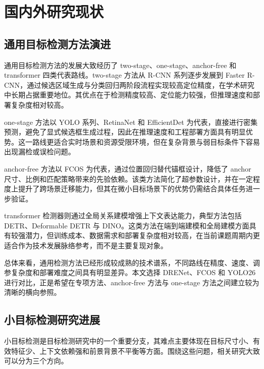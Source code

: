 
\chapter{国内外研究现状}
\label{ch:related_work}

\section{通用目标检测方法演进}

通用目标检测方法的发展大致经历了 two-stage、one-stage、anchor-free 和 transformer 四类代表路线。two-stage 方法从 R-CNN 系列逐步发展到 Faster R-CNN，通过候选区域生成与分类回归两阶段流程实现较高定位精度，在学术研究中长期占据重要地位\cite{girshick2014_rcnn,ren2015_fasterrcnn}。其优点在于检测精度较高、定位能力较强，但推理速度和部署复杂度相对较高。

one-stage 方法以 YOLO 系列、RetinaNet 和 EfficientDet 为代表，直接进行密集预测，避免了显式候选框生成过程，因此在推理速度和工程部署方面具有明显优势\cite{redmon2016_yolo,redmon2018_yolov3,lin2017_focalloss,tan2020_efficientdet}。这一路线更适合实时场景和资源受限环境，但在复杂背景与弱目标条件下容易出现漏检或误检问题。

anchor-free 方法以 FCOS 为代表，通过位置回归替代锚框设计，降低了 anchor 尺寸、比例和匹配策略带来的先验依赖\cite{tian2019_fcos}。该类方法简化了超参数设计，并在一定程度上提升了跨场景迁移能力，但其在微小目标场景下的优势仍需结合具体任务进一步验证。

transformer 检测器则通过全局关系建模增强上下文表达能力，典型方法包括 DETR、Deformable DETR 与 DINO\cite{carion2020_detr,zhu2021_deformabledetr,zhang2023_dino}。这类方法在端到端建模和全局建模方面具有较强潜力，但训练成本、数据需求和部署复杂度相对较高，在当前课题周期内更适合作为技术发展脉络参考，而不是主要复现对象。

总体来看，通用检测方法已经形成较成熟的技术谱系，不同路线在精度、速度、调参复杂度和部署难度之间具有明显差异。本文选择 DRENet、FCOS 和 YOLO26 进行对比，正是希望在专项方法、anchor-free 方法与 one-stage 方法之间建立较为清晰的横向参照。

\section{小目标检测研究进展}

小目标检测是目标检测研究中的一个重要分支，其难点主要体现在目标尺寸小、有效特征少、上下文依赖强和前景背景不平衡等方面。围绕这些问题，相关研究大致可以分为三个方向。

